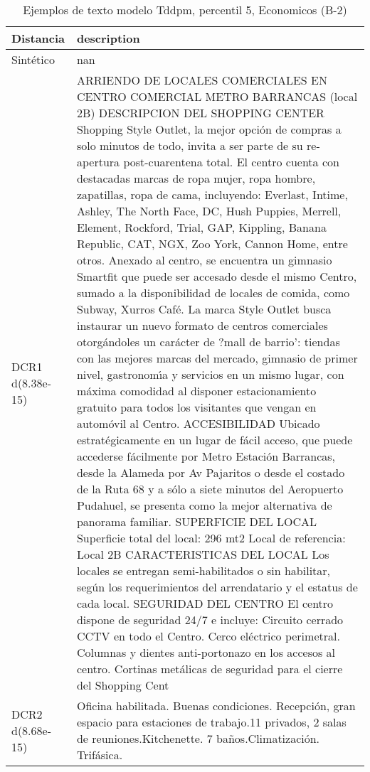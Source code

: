 \begin{table}[H]
\centering
\fontsize{10}{14}\selectfont
\caption{Ejemplos de texto modelo Tddpm, percentil 5, Economicos (B-2)}
\label{table-example-economicos-b-2-tddpm_mlp-5p-text}
\begin{tabular}{|l|m{35em}|}
\hline
\rowcolor[gray]{0.8}
Distancia & description \\
\hline Sintético & nan \\
\hline DCR1 d(8.38e-15) & ARRIENDO DE LOCALES COMERCIALES EN CENTRO COMERCIAL METRO BARRANCAS (local 2B)  DESCRIPCION DEL SHOPPING CENTER Shopping Style Outlet, la mejor opci\'on de compras a solo minutos de todo, invita a ser parte de su re-apertura post-cuarentena total.  El centro cuenta con destacadas marcas de ropa mujer, ropa hombre, zapatillas, ropa de cama, incluyendo: Everlast, Intime, Ashley, The North Face, DC, Hush Puppies, Merrell, Element, Rockford, Trial, GAP, Kippling, Banana Republic, CAT, NGX, Zoo York, Cannon Home, entre otros.   Anexado al centro, se encuentra un gimnasio Smartfit que puede ser accesado desde el mismo Centro, sumado a la disponibilidad de locales de comida, como Subway, Xurros Caf\'e.  La marca Style Outlet busca instaurar un nuevo formato de centros comerciales otorg\'andoles un car\'acter de ?mall de barrio': tiendas con las mejores marcas del mercado, gimnasio de primer nivel, gastronom{\'\i}a y servicios en un mismo lugar, con m\'axima comodidad al disponer estacionamiento gratuito para todos los visitantes que vengan en autom\'ovil al Centro.  ACCESIBILIDAD Ubicado estrat\'egicamente en un lugar de f\'acil acceso, que puede accederse f\'acilmente por Metro Estaci\'on Barrancas, desde la Alameda por Av Pajaritos o desde el costado de la Ruta 68 y a s\'olo a siete minutos del Aeropuerto Pudahuel, se presenta como la mejor alternativa de panorama familiar.  SUPERFICIE DEL LOCAL Superficie total del local: 296 mt2 Local de referencia: Local 2B  CARACTERISTICAS DEL LOCAL Los locales se entregan semi-habilitados o sin habilitar, seg\'un los requerimientos del arrendatario y el estatus de cada local.  SEGURIDAD DEL CENTRO El centro dispone de seguridad 24/7 e incluye: Circuito cerrado CCTV en todo el Centro. Cerco el\'ectrico perimetral. Columnas y dientes anti-portonazo en los accesos al centro. Cortinas met\'alicas de seguridad para el cierre del Shopping Cent \\
\hline DCR2 d(8.68e-15) & Oficina habilitada. Buenas condiciones. Recepci\'on, gran espacio para estaciones de trabajo.11 privados, 2 salas de reuniones.Kitchenette. 7 ba\~nos.Climatizaci\'on.  Trif\'asica. \\
\hline
\end{tabular}
\end{table}
